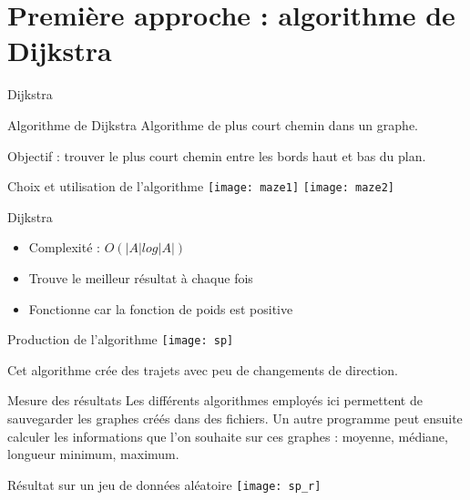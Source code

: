 \documentclass[aspectratio=43,11pt]{beamer}
\begin{document}
\section{Première approche : algorithme de Dijkstra}
\begin{frame}{Dijkstra}
    \begin{block}{Algorithme de Dijkstra}
        Algorithme de plus court chemin dans un graphe.
    \end{block}
    Objectif : trouver le plus court chemin entre les bords haut et bas du plan.
\end{frame}
\begin{frame}{Choix et utilisation de l'algorithme}
    \centering
    \texttt{[image: maze1]}
    \centering
    \texttt{[image: maze2]}
\end{frame}
\begin{frame}{Dijkstra}
    \begin{itemize}
        \item Complexité : $O(|A| log |A|)$
        \item Trouve le meilleur résultat à chaque fois
        \item Fonctionne car la fonction de poids est positive
    \end{itemize}
\end{frame}
\begin{frame}{Production de l'algorithme}
    \centering
        \texttt{[image: sp]}

    Cet algorithme crée des trajets avec peu de changements de direction.
\end{frame}
\begin{frame}{Mesure des résultats}
    Les différents algorithmes employés ici permettent de sauvegarder les graphes créés dans des fichiers.
    Un autre programme peut ensuite calculer les informations que l'on souhaite sur ces graphes : moyenne, médiane, longueur minimum, maximum.
\end{frame}
\begin{frame}{Résultat sur un jeu de données aléatoire}
    \centering
        \texttt{[image: sp\_r]}

\end{frame}
\end{document}
